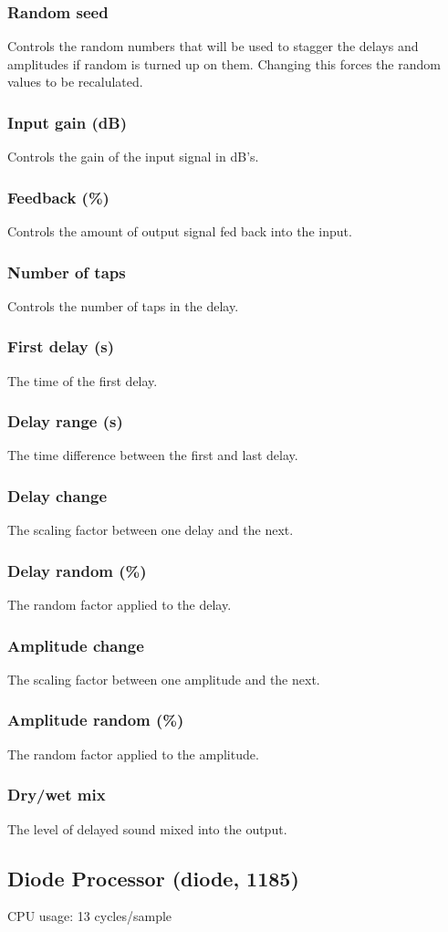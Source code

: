 \documentclass[11pt]{article}
\begin{document}
\subsubsection*{Random seed}
Controls the random numbers that will be used to stagger the delays and amplitudes if random is turned up on them. Changing this forces the random values to be recalulated.\subsubsection*{Input gain (dB)}
Controls the gain of the input signal in dB's.\subsubsection*{Feedback (\%)}
Controls the amount of output signal fed back into the input.\subsubsection*{Number of taps}
Controls the number of taps in the delay.\subsubsection*{First delay (s)}
The time of the first delay.\subsubsection*{Delay range (s)}
The time difference between the first and last delay.\subsubsection*{Delay change}
The scaling factor between one delay and the next.\subsubsection*{Delay random (\%)}
The random factor applied to the delay.\subsubsection*{Amplitude change}
The scaling factor between one amplitude and the next.\subsubsection*{Amplitude random (\%)}
The random factor applied to the amplitude.\subsubsection*{Dry/wet mix}
The level of delayed sound mixed into the output.\subsection{Diode Processor (diode, 1185)\label{diode}\label{id1185}}
CPU usage: 13 cycles/sample
\end{document}
